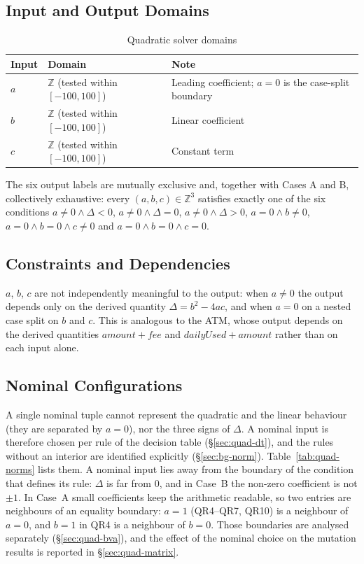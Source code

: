 \documentclass[11pt,a4paper]{article}
\begin{document}
\subsection{Input and Output Domains}
\label{sec:quad-domains}

\begin{table}[H]
\centering
\caption{Quadratic solver domains}
\begin{tabularx}{\textwidth}{l l Y}
\toprule
Input & Domain & Note \\
\midrule
\(a\) & \(\mathbb{Z}\) (tested within \([-100,100]\)) & Leading coefficient; \(a=0\) is the case-split boundary \\
\(b\) & \(\mathbb{Z}\) (tested within \([-100,100]\)) & Linear coefficient \\
\(c\) & \(\mathbb{Z}\) (tested within \([-100,100]\)) & Constant term \\
\bottomrule
\end{tabularx}
\end{table}

The six output labels are mutually exclusive and, together with Cases A and
B, collectively exhaustive: every \((a,b,c)\in\mathbb{Z}^3\) satisfies
exactly one of the six conditions \(a\ne0\wedge\Delta<0\),
\(a\ne0\wedge\Delta=0\), \(a\ne0\wedge\Delta>0\), \(a=0\wedge b\ne0\),
\(a=0\wedge b=0\wedge c\ne0\) and \(a=0\wedge b=0\wedge c=0\).

\subsection{Constraints and Dependencies}
\label{sec:quad-constraints}

\(a\), \(b\), \(c\) are not independently meaningful to the output: when
\(a\ne0\) the output depends only on the derived quantity
\(\Delta=b^2-4ac\), and when \(a=0\) on a nested case split on \(b\) and
\(c\). This is analogous to the ATM, whose output depends on the derived
quantities \(\mathit{amount}+\mathit{fee}\) and
\(\mathit{dailyUsed}+\mathit{amount}\) rather than on each input alone.

\subsection{Nominal Configurations}
\label{sec:quad-norms}

A single nominal tuple cannot represent the quadratic and the linear
behaviour (they are separated by \(a=0\)), nor the three signs of \(\Delta\).
A nominal input is therefore chosen per rule of the decision table
(\S\ref{sec:quad-dt}), and the rules without an interior are identified
explicitly (\S\ref{sec:bg-norm}). Table~\ref{tab:quad-norms} lists them. A
nominal input lies away from the boundary of the condition that defines its
rule: \(\Delta\) is far from \(0\), and in Case~B the non-zero coefficient
is not \(\pm1\). In Case~A small coefficients keep the arithmetic readable,
so two entries are neighbours of an equality boundary: \(a=1\) (QR4--QR7,
QR10) is a neighbour of \(a=0\), and \(b=1\) in QR4 is a neighbour of
\(b=0\). Those boundaries are analysed separately (\S\ref{sec:quad-bva}),
and the effect of the nominal choice on the mutation results is reported in
\S\ref{sec:quad-matrix}.
\end{document}
